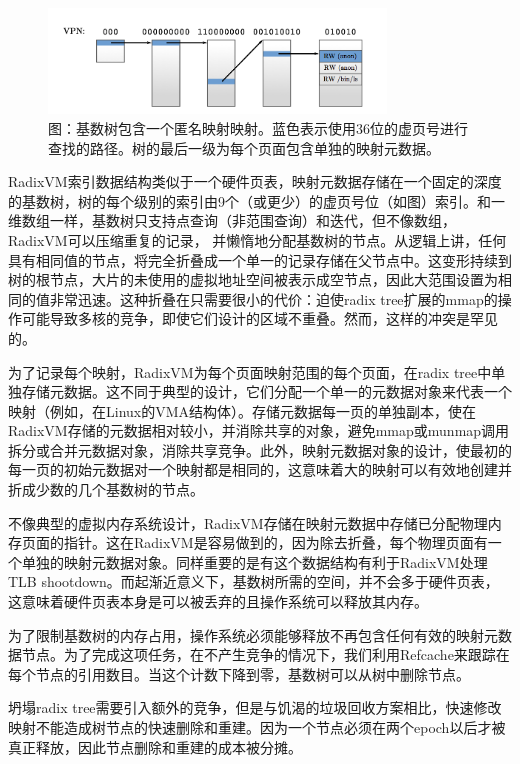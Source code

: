 \begin{figure}[ht]
  \centering
  \includegraphics[width=0.8\textwidth]{figures/appedix_radixvm.png} 
  \caption*{图：基数树包含一个匿名映射映射。蓝色表示使用36位的虚页号进行查找的路径。树的最后一级为每个页面包含单独的映射元数据。}
\end{figure}

RadixVM索引数据结构类似于一个硬件页表，映射元数据存储在一个固定的深度的基数树，树的每个级别的索引由9个（或更少）的虚页号位（如图）索引。和一维数组一样，基数树只支持点查询（非范围查询）和迭代，但不像数组，RadixVM可以压缩重复的记录，
并懒惰地分配基数树的节点。从逻辑上讲，任何具有相同值的节点，将完全折叠成一个单一的记录存储在父节点中。这变形持续到树的根节点，大片的未使用的虚拟地址空间被表示成空节点，因此大范围设置为相同的值非常迅速。这种折叠在只需要很小的代价：迫使radix
tree扩展的mmap的操作可能导致多核的竞争，即使它们设计的区域不重叠。然而，这样的冲突是罕见的。

为了记录每个映射，RadixVM为每个页面映射范围的每个页面，在radix
tree中单独存储元数据。这不同于典型的设计，它们分配一个单一的元数据对象来代表一个映射（例如，在Linux的VMA结构体）。存储元数据每一页的单独副本，使在RadixVM存储的元数据相对较小，并消除共享的对象，避免mmap或munmap调用拆分或合并元数据对象，消除共享竞争。此外，映射元数据对象的设计，使最初的每一页的初始元数据对一个映射都是相同的，这意味着大的映射可以有效地创建并折成少数的几个基数树的节点。

不像典型的虚拟内存系统设计，RadixVM存储在映射元数据中存储已分配物理内存页面的指针。这在RadixVM是容易做到的，因为除去折叠，每个物理页面有一个单独的映射元数据对象。同样重要的是有这个数据结构有利于RadixVM处理TLB
shootdown。而起渐近意义下，基数树所需的空间，并不会多于硬件页表，这意味着硬件页表本身是可以被丢弃的且操作系统可以释放其内存。

为了限制基数树的内存占用，操作系统必须能够释放不再包含任何有效的映射元数据节点。为了完成这项任务，在不产生竞争的情况下，我们利用Refcache来跟踪在每个节点的引用数目。当这个计数下降到零，基数树可以从树中删除节点。

坍塌radix
tree需要引入额外的竞争，但是与饥渴的垃圾回收方案相比，快速修改映射不能造成树节点的快速删除和重建。因为一个节点必须在两个epoch以后才被真正释放，因此节点删除和重建的成本被分摊。

